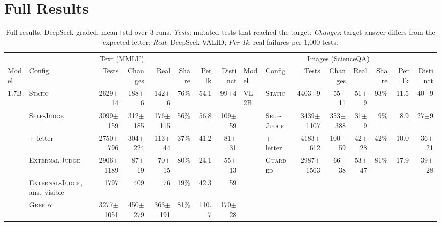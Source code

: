 \documentclass[sigconf]{acmart}
\newcommand{\HW}{\textsc{Static}}
\newcommand{\SJ}{\textsc{Self-Judge}}
\newcommand{\OJ}{\textsc{External-Judge}}
\newcommand{\BOLD}{\textsc{Greedy}}
\newcommand{\BR}{\textsc{Guarded}}
\newcommand{\pmstd}[1]{{\scriptsize$\pm$#1}}
\begin{document}
\balance



\clearpage
\nobalance
\appendix

\section{Full Results}

\begin{table}[t]
\centering
\caption{Full results, DeepSeek-graded, mean$\pm$std over 3 runs. \emph{Tests}: mutated tests that reached the target;
\emph{Changes}: target answer differs from the expected letter; \emph{Real}: DeepSeek VALID; \emph{Per 1k}: real
failures per 1{,}000 tests.}
\label{tab:full}
\footnotesize
\setlength{\tabcolsep}{3.5pt}
\begin{adjustbox}{max width=\textwidth}
\begin{tabular}{llrrrrrr@{\hspace{18pt}}llrrrrrr}
\toprule
\multicolumn{8}{c}{Text (MMLU)} & \multicolumn{8}{c}{Images (ScienceQA)} \\
\cmidrule(r{18pt}){1-8}\cmidrule{9-16}
Model & Config & Tests & Changes & Real & Share & Per 1k & Distinct & Model & Config & Tests & Changes & Real & Share & Per 1k & Distinct \\
\midrule
1.7B & \HW{} & 2629\pmstd{14} & 188\pmstd{6} & 142\pmstd{6} & 76\% & 54.1 & 99\pmstd{4} &
VL-2B & \HW{} & 4403\pmstd{9} & 55\pmstd{11} & 51\pmstd{9} & 93\% & 11.5 & 40\pmstd{9} \\
 & \SJ{} & 3099\pmstd{159} & 312\pmstd{185} & 176\pmstd{115} & 56\% & 56.8 & 109\pmstd{59} &
 & \SJ{} & 3439\pmstd{1107} & 353\pmstd{388} & 31\pmstd{9} & 9\% & 8.9 & 27\pmstd{9} \\
 & \quad + letter & 2750\pmstd{796} & 304\pmstd{224} & 113\pmstd{44} & 37\% & 41.2 & 81\pmstd{31} &
 & \quad + letter & 4183\pmstd{612} & 100\pmstd{59} & 42\pmstd{28} & 42\% & 10.0 & 36\pmstd{21} \\
 & \OJ{} & 2906\pmstd{1189} & 87\pmstd{19} & 70\pmstd{15} & 80\% & 24.1 & 55\pmstd{13} &
 & \BR{} & 2987\pmstd{1563} & 66\pmstd{38} & 53\pmstd{47} & 81\% & 17.9 & 39\pmstd{28} \\
 & \OJ{}, ans.\ visible & 1797 & 409 & 76 & 19\% & 42.3 & 59 & & & & & & & & \\
 & \BOLD{} & 3277\pmstd{1051} & 450\pmstd{279} & 363\pmstd{191} & 81\% & 110.7 & 170\pmstd{28} & & & & & & & & \\

\end{tabular}
\end{adjustbox}
\end{table}
\end{document}
